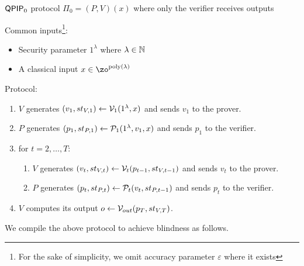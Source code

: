 \begin{protocol}{$\operatorname{\mathsf{QPIP}}_0$ protocol $\Pi_0=(P, V)(x)$ where only the verifier receives outputs}
	
	Common inputs\footnote{For the sake of simplicity, we omit accuracy parameter $\varepsilon$ where it exists}:
	\begin{itemize}
		\item Security parameter $1^\lambda$ where $\lambda\in\mathbb{N}$
		\item A classical input $x\in\zo^{\poly(\lambda)}$
	\end{itemize}

    Protocol:
	\begin{enumerate}
		\item $V$ generates $(v_1, st_{V, 1})\leftarrow\mathcal{V}_1(1^\lambda, x)$ and sends $v_1$ to the prover.
		\item $P$ generates $(p_1, st_{P, 1})\leftarrow\mathcal{P}_1(1^\lambda, v_1, x)$ and sends $p_1$ to the verifier.
		\item for $t=2,\ldots,T$:
		\begin{enumerate}
			\item $V$ generates $(v_t, st_{V, t})\leftarrow\mathcal{V}_t(p_{t-1}, st_{V, t-1})$ and sends $v_t$ to the prover.
			\item $P$ generates $(p_t, st_{P, t})\leftarrow\mathcal{P}_t(v_t, st_{P, t-1})$ and sends $p_t$ to the verifier.
		\end{enumerate}
		\item $V$ computes its output $o\leftarrow\mathcal{V}_{out}(p_T, st_{V, T})$.
	\end{enumerate}

\end{protocol}

We compile the above protocol to achieve blindness as follows.

